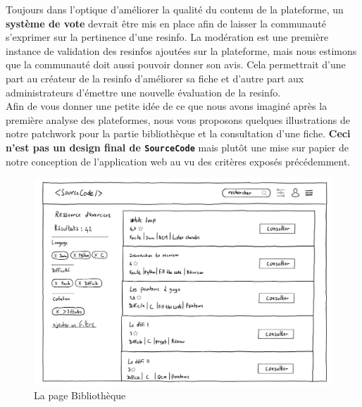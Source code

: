 Toujours dans l'optique d'améliorer la qualité du contenu de la plateforme, un \textbf{système de vote} devrait être mis en place afin de laisser la communauté s'exprimer sur la pertinence d'une \gls{resinfo}. La modération est une première instance de validation des \glspl{resinfo} ajoutées sur la plateforme, mais nous estimons que la communauté doit aussi pouvoir donner son avis. Cela permettrait d'une part au créateur de la \gls{resinfo} d'améliorer sa \gls{fiche} et d'autre part aux administrateurs d'émettre une nouvelle évaluation de la \gls{resinfo}.\\

Afin de vous donner une petite idée de ce que nous avons imaginé après la première analyse des plateformes, nous vous proposons quelques illustrations de notre patchwork pour la partie bibliothèque et la consultation d'une \gls{fiche}. \textbf{Ceci n'est pas un design final de \texttt{SourceCode}} mais plutôt une mise sur papier de notre conception de l'application web au vu des critères exposés précédemment.\\

\begin{figure}[H]
    \includegraphics[width=\textwidth,height=\textheight,keepaspectratio]{images/library.JPG}
    \centering
    \caption{La page Bibliothèque}
\end{figure}
\label{figure:patchwork}

